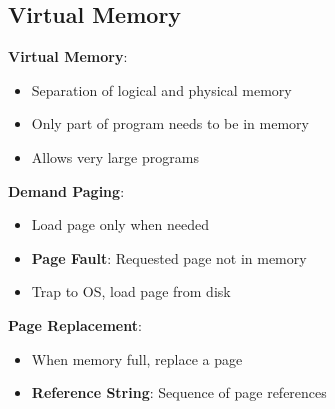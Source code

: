 \documentclass[12pt,a4paper]{report}
\begin{document}
\subsection{Virtual Memory}
\begin{concept}
\textbf{Virtual Memory}:
\begin{itemize}
    \item Separation of logical and physical memory
    \item Only part of program needs to be in memory
    \item Allows very large programs
\end{itemize}

\textbf{Demand Paging}:
\begin{itemize}
    \item Load page only when needed
    \item \textbf{Page Fault}: Requested page not in memory
    \item Trap to OS, load page from disk
\end{itemize}

\textbf{Page Replacement}:
\begin{itemize}
    \item When memory full, replace a page
    \item \textbf{Reference String}: Sequence of page references
\end{itemize}
\end{concept}
\end{document}
